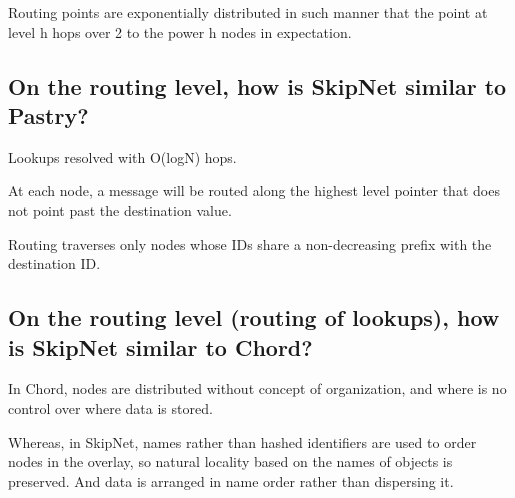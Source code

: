 \documentclass{article}
\begin{document}
Routing points are exponentially distributed in such manner that the point at level h hops over 2 to the power h nodes in expectation.


\subsection{On the routing level, how is SkipNet similar to Pastry?}
Lookups resolved with O(logN) hops.

At each node, a message will be routed along the highest level pointer that does not point past the destination value.

Routing traverses only nodes whose IDs share a non-decreasing prefix with the destination ID.


\subsection{On the routing level (routing of lookups), how is SkipNet similar to Chord?}
In Chord, nodes are distributed without concept of organization, and where is no control over where data is stored.

Whereas, in SkipNet, names rather than hashed identifiers are used to order nodes in the overlay, so natural locality based on the names of objects is preserved. And data  is arranged in name order rather than dispersing it.
\end{document}
